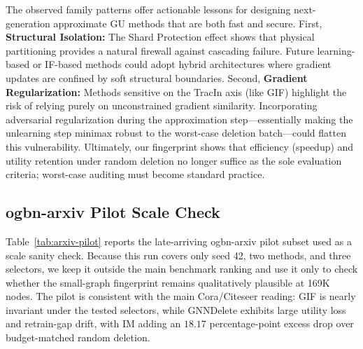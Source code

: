 The observed family patterns offer actionable lessons for designing next-generation approximate GU methods that are both fast and secure. 
First, \textbf{Structural Isolation:} The Shard Protection effect shows that physical partitioning provides a natural firewall against cascading failure. Future learning-based or IF-based methods could adopt hybrid architectures where gradient updates are confined by soft structural boundaries. 
Second, \textbf{Gradient Regularization:} Methods sensitive on the TracIn axis (like GIF) highlight the risk of relying purely on unconstrained gradient similarity. Incorporating adversarial regularization during the approximation step—essentially making the unlearning step minimax robust to the worst-case deletion batch—could flatten this vulnerability. 
Ultimately, our fingerprint shows that efficiency (speedup) and utility retention under random deletion no longer suffice as the sole evaluation criteria; worst-case auditing must become standard practice.

\subsection{ogbn-arxiv Pilot Scale Check}
\label{app:arxiv-pilot}

Table~\ref{tab:arxiv-pilot} reports the late-arriving ogbn-arxiv pilot
subset used as a scale sanity check. Because this run covers only seed
42, two methods, and three selectors, we keep it outside the main
benchmark ranking and use it only to check whether the small-graph
fingerprint remains qualitatively plausible at 169K nodes. The pilot is
consistent with the main Cora/Citeseer reading: GIF is nearly invariant
under the tested selectors, while GNNDelete exhibits large utility loss
and retrain-gap drift, with IM adding an $18.17$ percentage-point excess
drop over budget-matched random deletion.

